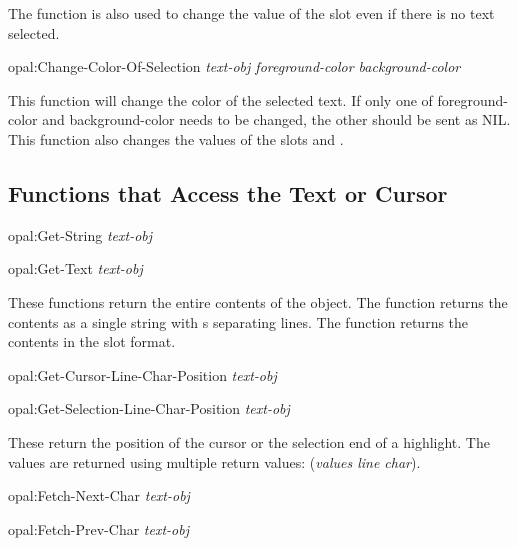 The function  is also used to change the value
of the slot  even if there is no text selected.


\begin{programexample}
opal:Change-Color-Of-Selection {\it text-obj  foreground-color background-color}\value{function}
\end{programexample}

This function will change the color of the selected text.  If only one of
foreground-color and background-color needs to be changed, the other should
be sent as NIL.  This function also changes the values of the slots  and .


\subsection{Functions that Access the Text or Cursor}

\begin{programexample}
opal:Get-String {\it text-obj}\value{function}

opal:Get-Text {\it text-obj}\value{function}
\end{programexample}

These functions return the entire contents of the  object.
The function  returns the contents as a single string with
s separating lines.  The function  returns the
contents in the  slot format.

\begin{programexample}
opal:Get-Cursor-Line-Char-Position {\it text-obj}\value{function}

opal:Get-Selection-Line-Char-Position {\it text-obj}\value{function}
\end{programexample}

These return the position of the cursor or the selection end of a highlight.
The values are returned using multiple return values: ({\it values line char}).

\begin{programexample}
opal:Fetch-Next-Char {\it text-obj}\value{function}

opal:Fetch-Prev-Char {\it text-obj}\value{function}
\end{programexample}

